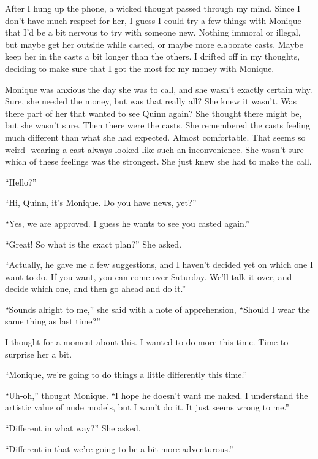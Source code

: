After I hung up the phone, a wicked thought passed through my mind. Since I don't have much
respect for her, I guess I could try a few things with Monique that I'd be a bit nervous to try
with someone new. Nothing immoral or illegal, but maybe get her outside while casted, or maybe
more elaborate casts. Maybe keep her in the casts a bit longer than the others. I drifted off in
my thoughts, deciding to make sure that I got the most for my money with Monique.

\begin{thought}
Monique was anxious the day she was to call, and she wasn't exactly certain why. Sure, she
needed the money, but was that really all? She knew it wasn't. Was there part of her that wanted
to see Quinn again? She thought there might be, but she wasn't sure. Then there were the casts.
She remembered the casts feeling much different than what she had expected. Almost comfortable.
That seems so weird- wearing a cast always looked like such an inconvenience. She wasn't sure
which of these feelings was the strongest. She just knew she had to make the call.
\end{thought}

``Hello?''

``Hi, Quinn, it's Monique. Do you have news, yet?''

``Yes, we are approved. I guess he wants to see you casted again.''

``Great! So what is the exact plan?'' She asked.

``Actually, he gave me a few suggestions, and I haven't decided yet on which one I want to
do. If you want, you can come over Saturday. We'll talk it over, and decide which one, and then
go ahead and do it.''

``Sounds alright to me,'' she said with a note of apprehension, ``Should I wear the same thing
as last time?''

I thought for a moment about this. I wanted to do more this time. Time to surprise her a
bit.

``Monique, we're going to do things a little differently this time.''

\begin{thought}
``Uh-oh,'' thought Monique. ``I hope he doesn't want me naked. I understand the artistic value
of nude models, but I won't do it. It just seems wrong to me.''
\end{thought}

``Different in what way?'' She asked.

``Different in that we're going to be a bit more adventurous.''

